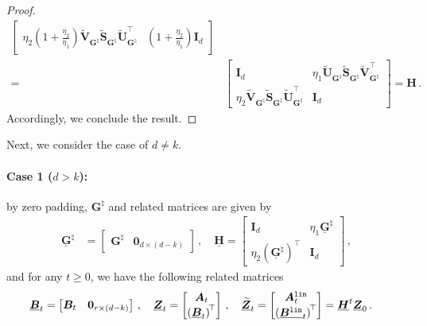 \begin{proof}
\begin{align*}
\begin{bmatrix}
        \eta_2 \left(1+\frac{\eta_2}{\eta_1}\right)\widetilde{\bm V}_{\bm G^\natural}\widetilde{\bm S}_{\bm G^\natural}\widetilde{\bm U}_{\bm G^\natural}^{\!\top} & \left(1+\frac{\eta_2}{\eta_1}\right)\bm I_d
    \end{bmatrix}\\
    = & \begin{bmatrix}
        \bm I_d & \eta_1 \widetilde{\bm U}_{\bm G^\natural}\widetilde{\bm S}_{\bm G^\natural}\widetilde{\bm V}_{\bm G^\natural}^{\!\top}\\
        \eta_2 \widetilde{\bm V}_{\bm G^\natural}\widetilde{\bm S}_{\bm G^\natural}\widetilde{\bm U}_{\bm G^\natural}^{\!\top} & \bm I_d
    \end{bmatrix}=\bm H\,.
    \end{align*}
    Accordingly, we conclude the result.
\end{proof}
Next, we consider the case of $d\neq k$.
\paragraph{Case 1 ($d>k$):} by zero padding, ${\bm G}^{\natural}$ and related matrices are given by
\begin{align*}
    \underline{\mathbf{G}}^\natural & = \begin{bmatrix}
        {\bm G}^{\natural} & \bm 0_{d \times (d-k)}
    \end{bmatrix}\,,\quad \underline{\bm H} = \begin{bmatrix}
        \bm I_d & \eta_1 \underline{\mathbf{G}}^\natural\\
        \eta_2 \left(\underline{\mathbf{G}}^\natural\right)^{\!\top} & \bm I_d
    \end{bmatrix}\,,
\end{align*}
and for any $t\geq 0$, we have the following related matrices
\begin{align*}
    \underline{\bm B}_t & = \begin{bmatrix}
        \bm B_t & \bm 0_{r\times (d-k)}
    \end{bmatrix}\,,\quad \underline{\bm Z}_t = \begin{bmatrix}
        \bm A_t \\ \left(\underline{\bm B}_t\right)^{\!\top}
    \end{bmatrix}\,,\quad \underline{\widetilde{\bm Z}}_t = \begin{bmatrix}
        \bm A^{\tt lin}_t \\
        \left(\underline{\bm B^{\tt lin}}_t\right)^{\!\top}
    \end{bmatrix} = \underline{\bm H}^t \underline{\bm Z}_0\,.
\end{align*}
